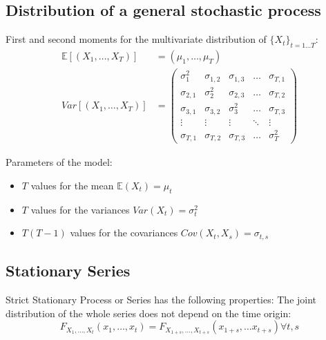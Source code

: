 \subsection{Distribution of a general stochastic process}

First and second moments for the multivariate distribution of $\{X_t\}_{t=1\dots T}$:
\begin{align*}
	\mathbb{E}[(X_1, \dots, X_T)] & = (\mu_1, \dots, \mu_T)                                              \\
	Var[(X_1, \dots, X_T)]        & = \begin{pmatrix}
		                                  \sigma_1^2   & \sigma_{1,2} & \sigma_{1,3} & \dots  & \sigma_{T,1} \\
		                                  \sigma_{2,1} & \sigma_2^2   & \sigma_{2,3} & \dots  & \sigma_{T,2} \\
		                                  \sigma_{3,1} & \sigma_{3,2} & \sigma_3^2   & \dots  & \sigma_{T,3} \\
		                                  \vdots       & \vdots       & \vdots       & \ddots & \vdots       \\
		                                  \sigma_{T,1} & \sigma_{T,2} & \sigma_{T,3} & \dots  & \sigma_T^2
	                                  \end{pmatrix}
\end{align*}

Parameters of the model:
\begin{itemize}
    \item $T$ values for the mean $\mathbb{E}(X_t) = \mu_t$
    \item $T$ values for the variances $Var(X_t) = \sigma_t^2$
    \item $T(T-1)$ values for the covariances $Cov(X_t, X_s) = \sigma_{t,s}$
\end{itemize}

\subsection{Stationary Series}

Strict Stationary Process or Series has the following properties:
The joint distribution of the whole series does not depend on the time
origin:
\begin{equation}
    F_{X_1, \dots, X_t}(x_1, \dots, x_t) = F_{X_{1+s}, \dots, X_{t+s}}(x_{1+s}, \dots x_{t+s}) \forall t,s
\end{equation}

